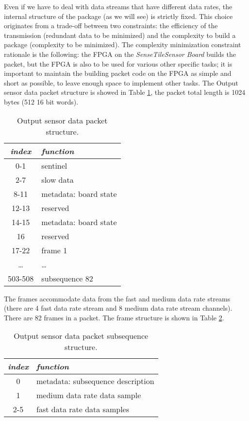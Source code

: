 \documentclass{article}
\newcommand{\ST}{\emph{SenseTile}\xspace}
\newcommand{\STSB}{\ST \emph{Sensor Board}\xspace}
\begin{document}
Even if we have to deal with data streams that have different data rates, the 
internal structure of the package (as we will see) is strictly fixed. 
This choice originates from a trade-off between two constraints: the efficiency 
of the transmission (redundant data to be minimized) and the complexity to build 
a package (complexity to be minimized).
The complexity minimization constraint rationale is the following: the FPGA 
on the \STSB builds the packet, but the FPGA is also to be used for various 
other specific tasks; it is important to maintain the building packet code on the 
FPGA as simple and short as possible, to leave enough space to implement other 
tasks.
The Output sensor data packet structure is showed in Table 
\ref{tab:data_packet_structure}, the packet total length is 1024 bytes (512 16 
bit words).

\begin{table}[htbp]
\caption{Output sensor data packet structure.}
\label{tab:data_packet_structure}
\begin{center}
\begin{tabular}{|c|l|}\hline
\textbf{\textit{index}} & \textbf{\textit{function}}\\\hline
0-1 & sentinel\\\hline
2-7 & slow data\\\hline
8-11 & metadata: board state\\\hline
12-13 & reserved\\\hline
14-15 & metadata: board state\\\hline
16 & reserved\\\hline
17-22 & frame 1\\\hline
\ldots & \ldots\\\hline
503-508 & subsequence 82\\\hline
\end{tabular}
\end{center}
\end{table}

The frames accommodate data from the fast and medium data rate streams 
(there are 4 fast data rate stream and 8 medium data rate stream channels). 
There are 82 frames in a packet.
The frame structure is shown in Table \ref{tab:subsequence_structure}.

\begin{table}[htbp]
\caption{Output sensor data packet subsequence structure.}
\label{tab:subsequence_structure}
\begin{center}
\begin{tabular}{|c|l|}\hline
\textbf{\textit{index}} & \textbf{\textit{function}}\\\hline
0 & metadata: subsequence description\\\hline
1 & medium data rate data sample\\\hline
2-5 & fast data rate data samples\\\hline
\end{tabular}
\end{center}
\end{table}
\end{document}

